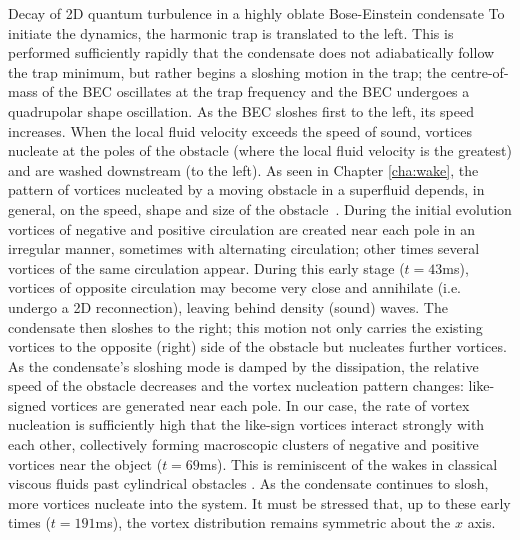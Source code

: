 \begin{chapter}{\label{cha:shin}Decay of 2D quantum turbulence in a highly oblate Bose-Einstein condensate}
To initiate the dynamics, the harmonic trap is translated to the left.  This is performed sufficiently rapidly that the condensate does not adiabatically follow the trap minimum, but rather begins a sloshing motion in the trap; the centre-of-mass of the BEC oscillates at the trap frequency and the BEC undergoes a quadrupolar shape oscillation. As the BEC sloshes first to the left, its speed increases.  When the local fluid velocity exceeds the speed of sound, vortices nucleate \cite{frisch92} at the poles of the obstacle
(where the local fluid velocity is the greatest) 
and are washed downstream (to the left).  
As seen in Chapter \ref{cha:wake}, the pattern of vortices nucleated by a moving obstacle 
in a superfluid depends, in general, on the  speed, shape and size of 
the obstacle~\citep{jma00,saito10,stagg_parker_14}. 
During the initial evolution vortices of negative
and positive circulation are created near each pole in an 
irregular manner, sometimes with alternating circulation;  
other times several vortices of the same circulation appear.
During this early stage ($t=43$ms), vortices of opposite 
circulation may become very close and annihilate (i.e. undergo 
a 2D reconnection), leaving behind density (sound) waves.
The condensate then sloshes to the right; this 
motion not only carries the existing vortices to the opposite 
(right) side of the obstacle but nucleates further vortices.
As the condensate's sloshing mode is damped by 
the dissipation, the relative speed of the obstacle decreases
and the vortex nucleation pattern changes: 
like-signed vortices are generated near each pole. 
In our case, the rate of vortex nucleation is sufficiently 
high that the like-sign vortices interact strongly with each other, 
collectively forming macroscopic clusters of negative and positive 
vortices near the object ($t=69$ms).  This is reminiscent of the wakes in classical viscous fluids past cylindrical obstacles \cite{stagg_parker_14}. 
As the condensate continues to slosh, more
vortices nucleate into the system. It must be stressed that,
up to these early times ($t=191$ms), the vortex distribution remains symmetric 
about the $x$ axis.


\end{chapter}
